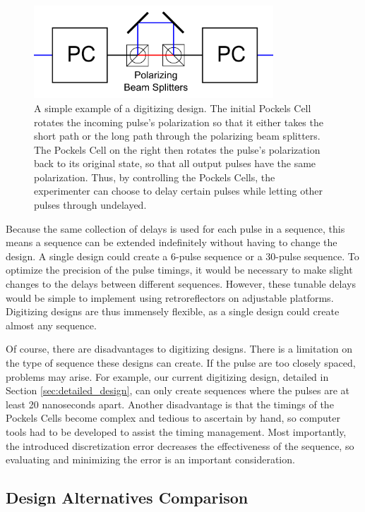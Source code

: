 \documentclass[pdftex,12pt,a4paper]{article}
\begin{document}
 \begin{figure}[t]
\centering
\includegraphics[width=0.8\textwidth]{simple_digitizing.png}
\caption{A simple example of a digitizing design. The initial Pockels Cell rotates the incoming pulse's polarization so that it either takes the short path or the long path through the polarizing beam splitters. The Pockels Cell on the right then rotates the pulse's polarization back to its original state, so that all output pulses have the same polarization. Thus, by controlling the Pockels Cells, the experimenter can choose to delay certain pulses while letting other pulses through undelayed.}
\label{fig:simple}
\end{figure}
    
	Because the same collection of delays is used for each pulse in a sequence, this means a sequence can be extended indefinitely without having to change the design. A single design could create a 6-pulse sequence or a 30-pulse sequence. To optimize the precision of the pulse timings, it would be necessary to make slight changes to the delays between different sequences. However, these tunable delays would be simple to implement using retroreflectors on adjustable platforms. Digitizing designs are thus immensely flexible, as a single design could create almost any sequence. 
    
Of course, there are disadvantages to digitizing designs. There is a limitation on the type of sequence these designs can create. If the pulse are too closely spaced, problems may arise. For example, our current digitizing design, detailed in Section \ref{sec:detailed_design}, can only create sequences where the pulses are at least 20 nanoseconds apart. Another disadvantage is that the timings of the Pockels Cells become complex and tedious to ascertain by hand, so computer tools had to be developed to assist the timing management. Most importantly, the introduced discretization error decreases the effectiveness of the sequence, so evaluating and minimizing the error is an important consideration.


\subsection{Design Alternatives Comparison}
\label{sec:comparison}
\end{document}
